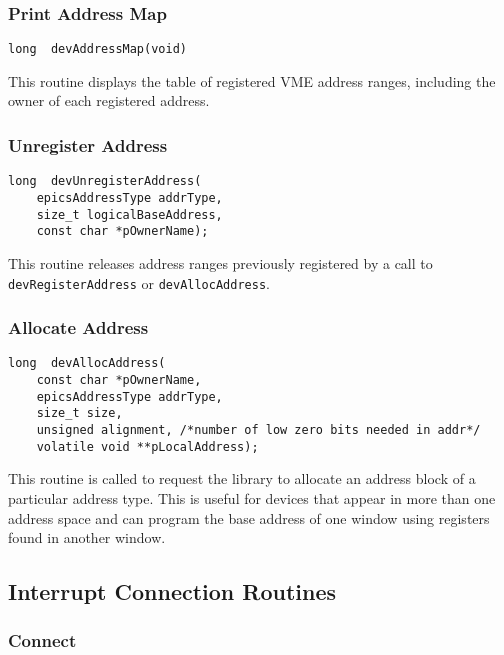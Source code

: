 \subsubsection{Print Address Map}

\begin{verbatim}
long  devAddressMap(void)
\end{verbatim}

This routine displays the table of registered VME address ranges, including the owner of each registered address.

\subsubsection{Unregister Address}

\begin{verbatim}
long  devUnregisterAddress(
    epicsAddressType addrType,
    size_t logicalBaseAddress,
    const char *pOwnerName);
\end{verbatim}

This routine releases address ranges previously registered by a call to \verb|devRegisterAddress| or \verb|devAllocAddress|.

\subsubsection{Allocate Address}

\begin{verbatim}
long  devAllocAddress(
    const char *pOwnerName,
    epicsAddressType addrType,
    size_t size,
    unsigned alignment, /*number of low zero bits needed in addr*/
    volatile void **pLocalAddress);
\end{verbatim}

This routine is called to request the library to allocate an address block of a particular address type. This is useful for 
devices that appear in more than one address space and can program the base address of one window using registers found 
in another window.

\subsection{Interrupt Connection Routines}

\subsubsection{Connect}

